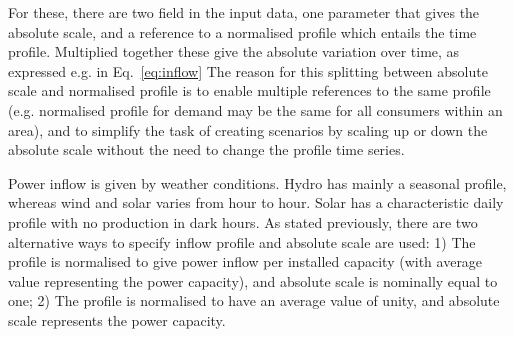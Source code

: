 \documentclass{article}
\begin{document}
For these, there are two field in the input data, one parameter that gives the absolute scale, and a reference to a normalised profile which entails the time profile. Multiplied together these give the absolute variation over time, as expressed e.g.  in Eq.~\eqref{eq:inflow}
%
The reason for this splitting between absolute scale and normalised profile is to enable multiple references to the same profile (e.g. normalised profile for demand may be the same for all consumers within an area), and to simplify the task of creating scenarios by scaling up or down the absolute scale without the need to change the profile time series.

Power inflow is given by weather conditions. Hydro has mainly a seasonal profile, whereas wind and solar varies from hour to hour. Solar has a characteristic daily profile with no production in dark hours. 
As stated previously, there are two alternative ways to specify inflow profile and absolute scale are used: 
1) The profile is normalised to give power inflow per installed capacity (with average value representing the power capacity), and absolute scale is nominally equal to one; 
2) The profile is normalised to have an average value of unity, and absolute scale represents the power capacity.



%
%
%
%
%
%
%
%
\end{document}
